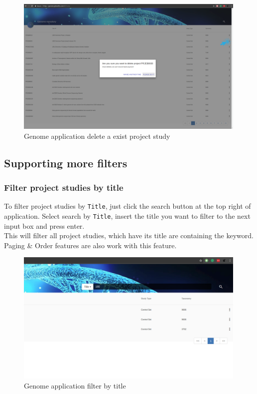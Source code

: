 \documentclass[a4paper,12pt]{article}
\begin{document}
\begin{figure}[H]
\centering
\includegraphics[width=0.99\textwidth]{images/genome-delete}
\caption{Genome application delete a exist project study}
\end{figure}

\subsection{Supporting more filters}
\subsubsection{Filter project studies by title}
To filter project studies by \texttt{Title}, just click the search button at the top right of application. Select search by \texttt{Title}, insert the title you want to filter to the next input box and press enter.\\
This will filter all project studies, which have its title are containing the keyword.\\
Paging \& Order features are also work with this feature.

\begin{figure}[H]
\centering
\includegraphics[width=0.99\textwidth]{images/genome-filter-title}
\caption{Genome application filter by title}
\end{figure}
\end{document}
